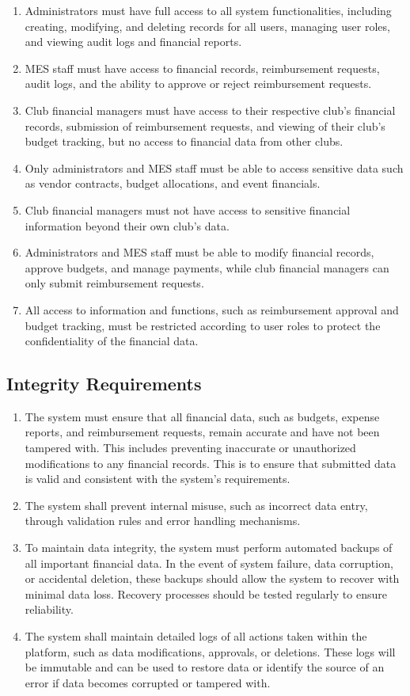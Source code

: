 \documentclass[12pt]{article}
\begin{document}
\begin{enumerate}
  \item Administrators must have full access to all system functionalities, including creating, modifying, and deleting records for all users, managing user roles, and viewing audit logs and financial reports.
  \item MES staff must have access to financial records, reimbursement requests, audit logs, and the ability to approve or reject reimbursement requests.
  \item Club financial managers must have access to their respective club's financial records, submission of reimbursement requests, and viewing of their club's budget tracking, but no access to financial data from other clubs.
  \item Only administrators and MES staff must be able to access sensitive data such as vendor contracts, budget allocations, and event financials.
  \item Club financial managers must not have access to sensitive financial information beyond their own club's data.
  \item Administrators and MES staff must be able to modify financial records, approve budgets, and manage payments, while club financial managers can only submit reimbursement requests.
  \item All access to information and functions, such as reimbursement approval and budget tracking, must be restricted according to user roles to protect the confidentiality of the financial data.
\end{enumerate}

\subsection{Integrity Requirements}

\begin{enumerate}
    \item The system must ensure that all financial data, such as budgets, expense reports, and reimbursement requests, remain accurate and have not been tampered with. This includes preventing inaccurate or unauthorized modifications to any financial records. This is to ensure that submitted data is valid and consistent with the system's requirements.
    \item The system shall prevent internal misuse, such as incorrect data entry, through validation rules and error handling mechanisms.
    \item To maintain data integrity, the system must perform automated backups of all important financial data. In the event of system failure, data corruption, or accidental deletion, these backups should allow the system to recover with minimal data loss. Recovery processes should be tested regularly to ensure reliability.
    \item The system shall maintain detailed logs of all actions taken within the platform, such as data modifications, approvals, or deletions. These logs will be immutable and can be used to restore data or identify the source of an error if data becomes corrupted or tampered with.
\end{enumerate}
\end{document}
